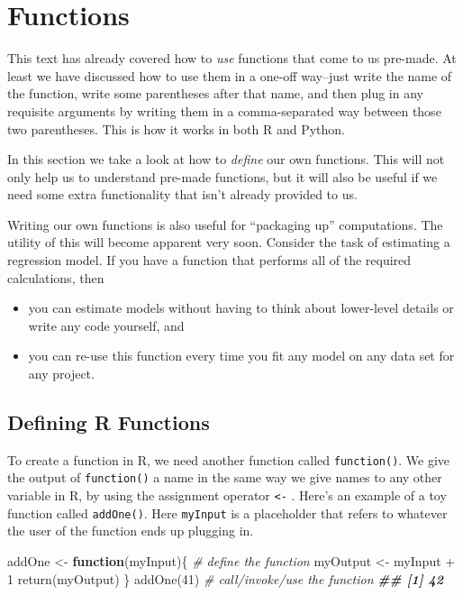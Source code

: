 \documentclass[
  12pt,
  krantz2]{krantz}
\makeatletter
\newenvironment{Shaded}{\begin{snugshade}}{\end{snugshade}}
\newcommand{\CommentTok}[1]{\textcolor[rgb]{0.37,0.37,0.37}{\textit{#1}}}
\newcommand{\ControlFlowTok}[1]{\textcolor[rgb]{0.27,0.27,0.27}{\textbf{#1}}}
\newcommand{\DecValTok}[1]{\textcolor[rgb]{0.06,0.06,0.06}{#1}}
\newcommand{\DocumentationTok}[1]{\textcolor[rgb]{0.37,0.37,0.37}{\textbf{\textit{#1}}}}
\newcommand{\FunctionTok}[1]{\textcolor[rgb]{0,0,0}{#1}}
\newcommand{\NormalTok}[1]{#1}
\newcommand{\OtherTok}[1]{\textcolor[rgb]{0.37,0.37,0.37}{#1}}
\newcommand{\SpecialCharTok}[1]{\textcolor[rgb]{0,0,0}{#1}}
\providecommand{\tightlist}{%
  \setlength{\itemsep}{0pt}\setlength{\parskip}{0pt}}
\newenvironment{kframe}{%
\medskip{}
\setlength{\fboxsep}{.8em}
 \def\at@end@of@kframe{}%
 \ifinner\ifhmode%
  \def\at@end@of@kframe{\end{minipage}}%
  \begin{minipage}{\columnwidth}%
 \fi\fi%
 \def\FrameCommand##1{\hskip\@totalleftmargin \hskip-\fboxsep
 \colorbox{shadecolor}{##1}\hskip-\fboxsep
     \hskip-\linewidth \hskip-\@totalleftmargin \hskip\columnwidth}%
 \MakeFramed {\advance\hsize-\width
   \@totalleftmargin\z@ \linewidth\hsize
   \@setminipage}}%
 {\par\unskip\endMakeFramed%
 \at@end@of@kframe}
\renewenvironment{Shaded}{\begin{kframe}}{\end{kframe}}
\makeatother
\begin{document}
\hypertarget{functions}{%
\chapter{Functions}\label{functions}}

This text has already covered how to \emph{use} functions that come to us pre-made. At least we have discussed how to use them in a one-off way--just write the name of the function, write some parentheses after that name, and then plug in any requisite arguments by writing them in a comma-separated way between those two parentheses. This is how it works in both R and Python.

In this section we take a look at how to \emph{define} our own functions. This will not only help us to understand pre-made functions, but it will also be useful if we need some extra functionality that isn't already provided to us.

Writing our own functions is also useful for ``packaging up'' computations. The utility of this will become apparent very soon. Consider the task of estimating a regression model. If you have a function that performs all of the required calculations, then

\begin{itemize}
\tightlist
\item
  you can estimate models without having to think about lower-level details or write any code yourself, and
\item
  you can re-use this function every time you fit any model on any data set for any project.
\end{itemize}

\hypertarget{defining-r-functions}{%
\section{Defining R Functions}\label{defining-r-functions}}

To create a function in R, we need another function called \texttt{function()}. We give the output of \texttt{function()} a name in the same way we give names to any other variable in R, by using the assignment operator \texttt{\textless{}-} . Here's an example of a toy function called \texttt{addOne()}. Here \texttt{myInput} is a placeholder that refers to whatever the user of the function ends up plugging in.

\begin{Shaded}
\begin{Highlighting}[]
\NormalTok{addOne }\OtherTok{\textless{}{-}} \ControlFlowTok{function}\NormalTok{(myInput)\{  }\CommentTok{\# define the function}
\NormalTok{  myOutput }\OtherTok{\textless{}{-}}\NormalTok{ myInput }\SpecialCharTok{+} \DecValTok{1}
  \FunctionTok{return}\NormalTok{(myOutput)}
\NormalTok{\}}
\FunctionTok{addOne}\NormalTok{(}\DecValTok{41}\NormalTok{) }\CommentTok{\# call/invoke/use the function }
\DocumentationTok{\#\# [1] 42}
\end{Highlighting}
\end{Shaded}
\end{document}
